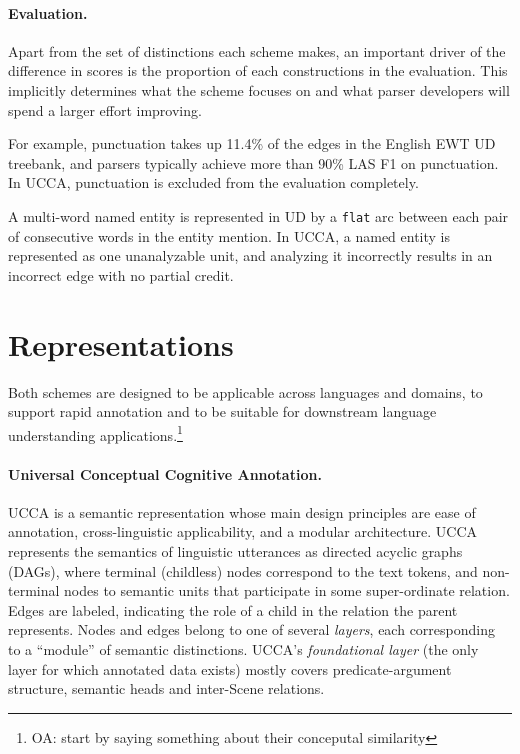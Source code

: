 \documentclass[11pt,a4paper]{article}
\newcommand{\oa}[1]{\footnote{\color{red}OA: #1}}
\begin{document}
\paragraph{Evaluation.}

Apart from the set of distinctions each scheme makes,
an important driver of the difference in scores is the proportion of each constructions
in the evaluation.
This implicitly determines what the scheme focuses on and what parser developers
will spend a larger effort improving.

For example, punctuation takes up 11.4\% of the edges in the English EWT UD treebank,
and parsers typically achieve more than 90\% LAS F1 on punctuation.
In UCCA, punctuation is excluded from the evaluation completely.

A multi-word named entity is represented in UD by a \verb|flat| arc between
each pair of consecutive words in the entity mention.
In UCCA, a named entity is represented as one unanalyzable unit, and analyzing it
incorrectly results in an incorrect edge with no partial credit.



\section{Representations}\label{sec:representations}

  Both schemes are designed to be applicable across languages and domains, 
  to support rapid annotation and to be suitable for downstream language understanding applications.\oa{start by saying something about their conceputal similarity}



\paragraph{Universal Conceptual Cognitive Annotation.}\label{sec:ucca}
UCCA \cite{abend2013universal} is a semantic representation whose main design principles
are ease of annotation, cross-linguistic applicability, and a modular architecture.
UCCA represents the semantics of linguistic utterances
as directed acyclic graphs (DAGs), where terminal (childless) nodes
correspond to the text tokens, and non-terminal nodes to semantic units that participate
in some super-ordinate relation.
Edges are labeled, indicating the role of a child in the relation the parent represents.
Nodes and edges belong to one of several \textit{layers}, each corresponding
to a ``module'' of semantic distinctions.
UCCA's \textit{foundational layer} (the only layer for which annotated data exists)
mostly covers predicate-argument structure, semantic heads and inter-Scene relations.
\end{document}
